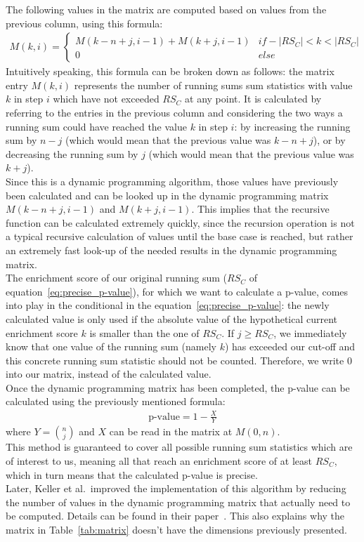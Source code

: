 The following values in the matrix are computed based on values from the previous column, using this formula:
\begin{align}
M(k,i)=\label{eq:precise_p-value}
\begin{cases}
	M(k-n+j, i-1)+M(k+j, i-1) & if -|RS_{C}| < k < |RS_{C}| \\
	0 & else
\end{cases}
\end{align}
Intuitively speaking, this formula can be broken down as follows: the matrix entry $M(k,i)$ represents the number of running sums sum statistics with value $k$ in step $i$ which have not exceeded $RS_{C}$ at any point. It is calculated by referring to the entries in the previous column and considering the two ways a running sum could have reached the value $k$ in step $i$: by increasing the running sum by $n-j$ (which would mean that the previous value was $k-n+j$), or by decreasing the running sum by $j$ (which would mean that the previous value was $k+j$).\\
Since this is a dynamic programming algorithm, those values have previously been calculated and can be looked up in the dynamic programming matrix $M(k-n+j, i-1)$ and $M(k+j, i-1)$. This implies that the recursive function can be calculated extremely quickly, since the recursion operation is not a typical recursive calculation of values until the base case is reached, but rather an extremely fast look-up of the needed results in the dynamic programming matrix.\\
The enrichment score of our original running sum ($RS_{C}$ of equation~\ref{eq:precise_p-value}), for which we want to calculate a p-value, comes into play in the conditional in the equation~\ref{eq:precise_p-value}: the newly calculated value is only used if the absolute value of the hypothetical current enrichment score $k$ is smaller than the one of $RS_{C}$. If $j \geq RS_{C}$, we immediately know that one value of the running sum (namely $k$) has exceeded our cut-off and this concrete running sum statistic should not be counted. Therefore, we write $0$ into our matrix, instead of the calculated value.\\
Once the dynamic programming matrix has been completed, the p-value can be calculated using the previously mentioned formula:
\begin{align}
\text{p-value} = 1-\frac{X}{Y}
\end{align}
where $Y = \binom{n}{j}$ and $X$ can be read in the matrix at $M(0,n)$.\\
This method is guaranteed to cover all possible running sum statistics which are of interest to us, meaning all that reach an enrichment score of at least $RS_{C}$, which in turn means that the calculated p-value is precise.\\
Later, Keller et al.\ improved the implementation of this algorithm by reducing the number of values in the dynamic programming matrix that actually need to be computed. Details can be found in their paper~\cite{genetrail_dynamic_programming}. This also explains why the matrix in Table~\ref{tab:matrix} doesn't have the dimensions previously presented.

